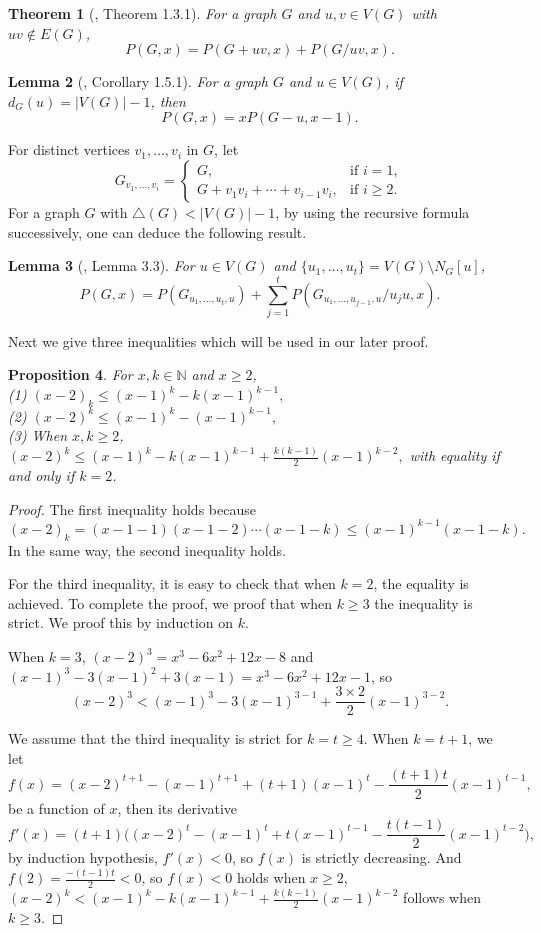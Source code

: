 \documentclass[12pt]{article}
\newtheorem{theorem}{Theorem}[section]
\newtheorem{proposition}[theorem]{Proposition}
\newtheorem{lemma}[theorem]{Lemma}
\theoremstyle{definition}
\begin{document}
\begin{theorem}[\cite{DKT05}, Theorem 1.3.1]\label{RF} For a graph $G$ and $u,v\in V(G)$ with $uv\not\in E(G)$,
$$P(G,x)=P(G+uv, x)+P(G/uv, x).$$
\end{theorem}

\begin{lemma}[\cite{DKT05}, Corollary 1.5.1]\label{MF} For a graph $G$ and $u\in V(G)$, if $d_{G}(u)=|V(G)|-1$, then
$$P(G,x)=xP(G-u, x-1).$$
\end{lemma}

For distinct vertices $v_1,\ldots,v_i$ in $G$, let
$$G_{v_1,\ldots,v_i}=\left\{\begin{array}{cc}
              G,   &\mbox{if }  i=1, \\
              G+v_1v_i+\cdots+v_{i-1}v_i, &\mbox{if }  i\geq 2.
              \end{array}\right.
             $$
For a graph $G$ with $\triangle (G)<|V(G)|-1$, by using the recursive formula successively, one can deduce the following result.

\begin{lemma}[\cite{Dong00}, Lemma 3.3] \label{D00} For $u\in V(G)$ and $\{u_1,\ldots, u_t\}=V(G)\setminus N_{G}[u]$,
$$P(G,x)=P(G_{u_1,\ldots, u_t,u})+\sum\limits_{j=1}^{t}P(G_{u_1,\ldots,u_{j-1},u}/u_ju,x).$$
\end{lemma}

Next we give three inequalities which will be used in our later proof.

\begin{proposition} \label{ineqs} For $x,k\in \mathbb{N}$ and $x\geq 2$,
\\(1) $(x-2)_k\leq (x-1)^k-k(x-1)^{k-1},$
\\(2) $(x-2)^k\leq(x-1)^k-(x-1)^{k-1},$
\\(3) When $x,k \geq 2$, $(x-2)^k\leq (x-1)^k-k(x-1)^{k-1}+\frac{k(k-1)}{2}(x-1)^{k-2}, $ with equality if and only if $k=2$.
\end{proposition}

\begin{proof} The first inequality holds because
$$(x-2)_{k}=(x-1-1)(x-1-2)\cdots(x-1-k)\leq (x-1)^{k-1}(x-1-k).$$ In the same way, the second inequality holds.

For the third inequality, it is easy to check that when $k=2$, the equality is achieved. To complete the proof, we proof that
when $k\geq 3$ the inequality is strict. We proof this by induction on $k$.

When $k=3$, $(x-2)^3=x^3-6x^2+12x-8$ and $(x-1)^3-3(x-1)^2+3(x-1)=x^3-6x^2+12x-1$, so
$$(x-2)^3<(x-1)^3-3(x-1)^{3-1}+\frac{3\times 2}{2}(x-1)^{3-2}.$$

We assume that the third inequality is strict for $k=t\geq 4$. When $k=t+1$, we let
$$f(x)=(x-2)^{t+1}-(x-1)^{t+1}+(t+1)(x-1)^{t}-\frac{(t+1)t}{2}(x-1)^{t-1},$$ be a function of $x$, then its derivative
$$f'(x)=(t+1)\big((x-2)^{t}-(x-1)^{t}+t(x-1)^{t-1}-\frac{t(t-1)}{2}(x-1)^{t-2}\big),$$
by induction hypothesis, $f'(x)<0$, so $f(x)$ is strictly decreasing. And $f(2)=\frac{-(t-1)t}{2}<0$, so $f(x)<0$ holds when $x\geq 2$,
$(x-2)^k< (x-1)^k-k(x-1)^{k-1}+\frac{k(k-1)}{2}(x-1)^{k-2}$ follows when $k\geq 3$.
\end{proof}
\end{document}
